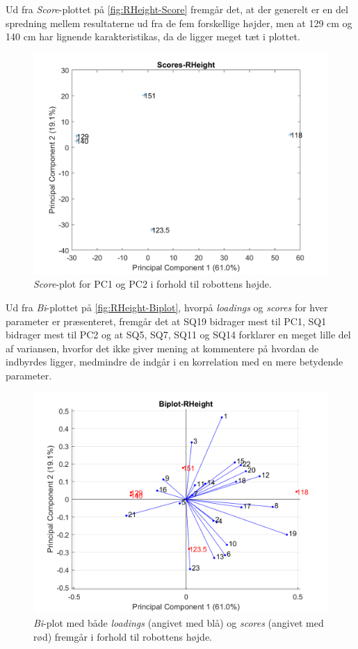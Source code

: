 \noindent
%
Ud fra \textit{Score}-plottet på \autoref{fig:RHeight-Score} fremgår det, at der generelt er en del spredning mellem resultaterne ud fra de fem forskellige højder, men at 129 cm og 140 cm har lignende karakteristikas, da de ligger meget tæt i plottet.
%
\begin{figure}[H]
\centering
\includegraphics[width=\textwidth]{Figure/DatabehandlingSkalaer/PCAfigures/RHeight-Scores}
\caption{\textit{Score}-plot for PC1 og PC2 i forhold til robottens højde.}
\label{fig:RHeight-Score}
\end{figure}
\noindent
%
Ud fra \textit{Bi}-plottet på \autoref{fig:RHeight-Biplot}, hvorpå \textit{loadings} og \textit{scores} for hver parameter er præsenteret, fremgår det at SQ19 bidrager mest til PC1, SQ1 bidrager mest til PC2 og at SQ5, SQ7, SQ11 og SQ14 forklarer en meget lille del af variansen, hvorfor det ikke giver mening at kommentere på hvordan de indbyrdes ligger, medmindre de indgår i en korrelation med en mere betydende parameter. 
%
\begin{figure}[H]
\centering
\includegraphics[width=\textwidth]{Figure/DatabehandlingSkalaer/PCAfigures/RHeight-Biplot.png}
\caption{\textit{Bi}-plot med både \textit{loadings} (angivet med blå) og \textit{scores} (angivet med rød) fremgår i forhold til robottens højde.}
\label{fig:RHeight-Biplot}
\end{figure}
